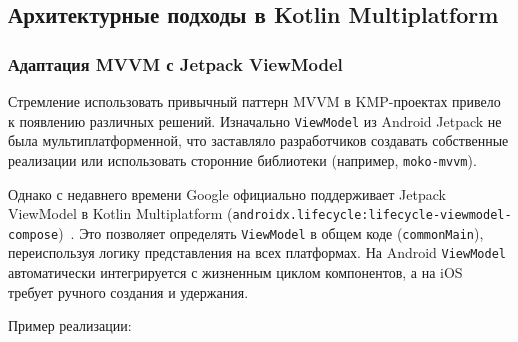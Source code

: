 \documentclass[14pt, russian]{scrartcl}
\begin{document}
\subsection{Архитектурные подходы в Kotlin Multiplatform}

\subsubsection{Адаптация MVVM с Jetpack ViewModel}

Стремление использовать привычный паттерн MVVM в KMP-проектах привело к появлению различных решений. Изначально \texttt{ViewModel} из Android Jetpack не была мультиплатформенной, что заставляло разработчиков создавать собственные реализации или использовать сторонние библиотеки (например, \texttt{moko-mvvm}).

Однако с недавнего времени Google официально поддерживает Jetpack ViewModel в Kotlin Multiplatform (\texttt{androidx.lifecycle:lifecycle-viewmodel-compose})~\cite{kvmodel}. Это позволяет определять \texttt{ViewModel} в общем коде (\texttt{commonMain}), переиспользуя логику представления на всех платформах. На Android \texttt{ViewModel} автоматически интегрируется с жизненным циклом компонентов, а на iOS требует ручного создания и удержания.

Пример реализации:
\end{document}
